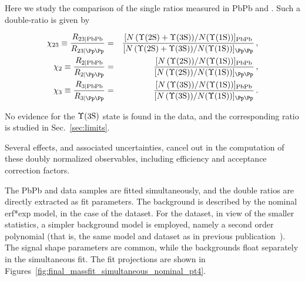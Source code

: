 Here we study the comparison of the single ratios measured in PbPb and \Pp\Pp{}.
Such a double-ratio is given by 
%
\begin{linenomath}
\begin{eqnarray}
\label{eqn:x23:def}
\chi_{23} \equiv 
\frac{R_{23|\text{PbPb}}}{R_{23|\Pp\Pp}}
&=& \frac{
  [{N\left(\PgUb+\PgUc\right)}/{N(\PgUa)}]_{\text{PbPb}}
}{
  [{N\left(\PgUb+\PgUc\right)}/{N(\PgUa)}]_{\Pp\Pp}
} \,, \\
%
\label{eqn:x2:def}
\chi_{2} \equiv 
\frac{R_{2|\text{PbPb}}}{R_{2|\Pp\Pp}}
&=& \frac{
  [{N\left(\PgUb\right)}/{N(\PgUa)}]_{\text{PbPb}}
}{
  [{N\left(\PgUb\right)}/{N(\PgUa)}]_{\Pp\Pp}
} \,, \\
%
\label{eqn:x3:def}
\chi_{3} \equiv 
\frac{R_{3|\text{PbPb}}}{R_{3|\Pp\Pp}}
&=& \frac{
  [{N\left(\PgUc\right)}/{N(\PgUa)}]_{\text{PbPb}}
}{
  [{N\left(\PgUc\right)}/{N(\PgUa)}]_{\Pp\Pp}
} \,.
\end{eqnarray}
\end{linenomath}
%
No evidence for the $\Upsilon\mathrm{(3S)}$ state is found in the \PbPb data, and the corresponding ratio is studied in Sec.~\ref{sec:limits}. 

Several effects, and associated uncertainties, cancel out in the computation of these doubly normalized observables, including efficiency and acceptance correction factors. 
%

The PbPb and \Pp\Pp{} data samples are fitted simultaneously, and the double ratios
are directly extracted as fit parameters. 
The background is described by the nominal erf*exp model, in the case of the \PbPb dataset. 
For the \pp dataset, in view of the smaller statistics, a simpler background model is employed, namely a second order polynomial (that is, the same model and dataset as in previous publication~\cite{prl}).
%
The signal shape parameters are common, while the backgrounds float separately in the simultaneous fit. 
%
The fit projections are shown in Figures~\ref{fig:final_massfit_simultaneous_nominal_pt4}.

